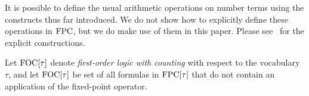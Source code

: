 \documentclass[../paper.tex]{subfiles}
\begin{document}
It is possible to define the usual arithmetic operations on number terms using
the constructs thus far introduced. We do not show how to explicitly define
these operations in $\text{\upshape FPC}$, but we do make use of them in this paper. Please
see~\cite{grohe2017descriptive} for the explicit constructions.

Let $\text{\upshape FOC}[\tau]$ denote \emph{first-order logic with counting} with respect to
the vocabulary $\tau$, and let $\text{\upshape FOC}[\tau]$ be set of all formulas in
$\text{\upshape FPC}[\tau]$ that do not contain an application of the fixed-point operator.



\end{document}
